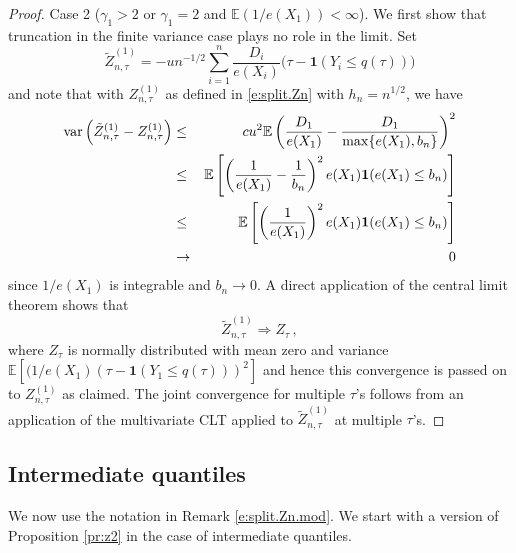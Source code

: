 \documentclass[12pt]{amsart}
\newcommand{\1}{\mathbbm{1}}
\newcommand{\0}{\mathbf{0}}
\newcommand{\one}{\mathbf{1}}
\newcommand{\E}{\mathbb{E}}
\theoremstyle{plain}
\theoremstyle{definition}
\begin{document}
\begin{proof}
\medskip 
\noindent  Case 2  ($\gamma_1>2$ or $\gamma_1=2$ and $\E(1/e(X_1))<\infty$). We first show that truncation in the finite variance case plays no role in the limit.  Set  
\begin{equation*}
 \tilde Z_{n,\tau}^{(1)}=-un^{-1/2} \sum_{i=1}^n \frac{D_i}{e(X_i)}
  \bigl( \tau-\one(Y_i\leq q(\tau))\bigr) 
\end{equation*}
and note that with $Z_{n,\tau}^{(1)}$ as defined in \eqref{e:split.Zn} with $h_n=n^{1/2}$, we have
\begin{eqnarray*}
   {\rm var} \left(\tilde Z_{n,\tau}^{(1)}- Z_{n,\tau}^{(1)}\right)&\le& cu^2
   \E\left(\frac{D_1}{e(X_1)}-\frac{D_1}{\max\{e(X_1),b_n\}}\right)^2 \\
   &\le &\E\left[\left(\frac{1}{e(X_1)}-\frac{1}{b_n}\right)^2 e(X_1)\one(e(X_1)\le b_n)\right]\\
  &\le &\E\left[\left(\frac{1}{e(X_1)}\right)^2e(X_1) \one(e(X_1)\le b_n)\right]\\
  &\to& 0
\end{eqnarray*}
since $1/e(X_1)$ is integrable and $b_n\to 0$. A direct application of the central limit theorem shows that 
$$
\tilde Z_{n,\tau}^{(1)}\Rightarrow Z_{\tau}\,,
$$
where $Z_{\tau}$ is normally distributed with mean zero and variance 
$\E\left[(1/e(X_1)\left(\tau-\one(Y_1\le q(\tau))\right)^2\right]$ and hence this convergence is passed on to $Z_{n,\tau}^{(1)}$ as claimed. The joint convergence for multiple $\tau$'s follows from an application of the multivariate CLT applied to  $\tilde Z_{n,\tau}^{(1)}$ at multiple $\tau$'s.


\end{proof}





\subsection{Intermediate quantiles} \label{subsec:intermediate}
We now use the notation in Remark \ref{e:split.Zn.mod}. 
We start with a version of Proposition \ref{pr:z2} in the case of
intermediate quantiles. 

%
\end{document}
